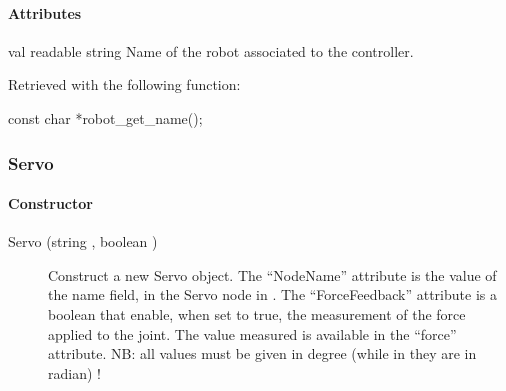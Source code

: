 \paragraph{Attributes}

\noindent
\begin{itemize}
\begin{attribute}{val}
  {readable}
  {string}
  {}
  Name of the robot associated to the \urbi controller.

  Retrieved with the following \webots function:
\begin{cxx}
const char *robot_get_name();
\end{cxx}
\end{attribute}

\end{itemize}

\subsubsection{Servo}

\paragraph{Constructor}

\noindent
\begin{description}
\item[{Servo (string , boolean )}]
  Construct a new Servo object. The ``NodeName'' attribute is the
  value of the name field, in the Servo node in \webots. The
  ``ForceFeedback'' attribute is a boolean that enable, when set to
  true, the measurement of the force applied to the joint. The value
  measured is available in the ``force'' attribute.  NB: all values
  must be given in degree (while in \webots they are in radian) !
\end{description}

